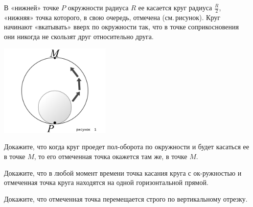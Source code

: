 ﻿
\noindent В «нижней» точке $P$ окружности радиуса $R$ ее касается круг радиуса $\tfrac{R}{2}$, «нижняя» точка которого, в свою очередь, отмечена (см.\,рисунок). Круг начинают «вкатывать» вверх по окружности так, что в точке соприкосновения они никогда не скользят друг относительно друга.

\centerline{\includegraphics[width=5.5cm]{stats/2018/images/circle-move}}

\begin{enumerate}
\itA Докажите, что когда круг проедет пол-оборота по окружности и будет касаться ее в точке $M$, то его отмеченная точка окажется там же, в точке $M$.

\itB Докажите, что в любой момент времени точка касания круга с ок-\linebreak ружностью и отмеченная точка круга находятся на одной горизонтальной прямой.

\itC Докажите, что отмеченная точка перемещается строго по вертикальному отрезку.
\end{enumerate}